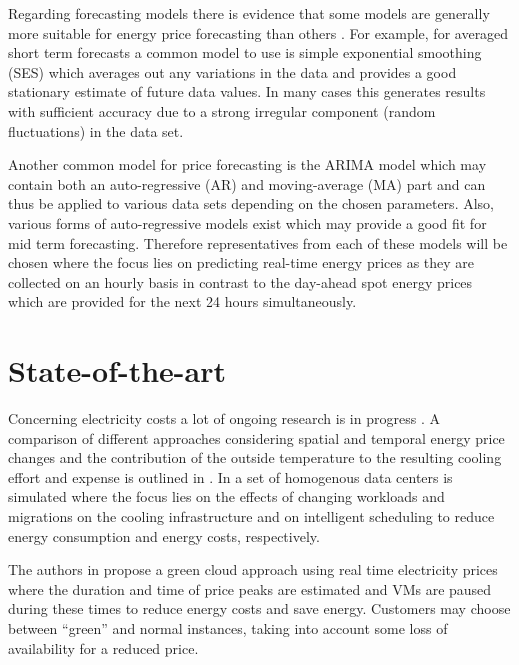 \documentclass[a4paper]{article}
\begin{document}
Regarding forecasting models there is evidence that some models are generally more suitable for energy price forecasting than others \cite{weron2008forecasting}\cite{weron2005forecasting}. For example, for averaged short term forecasts a common model to use is simple exponential smoothing (SES) which averages out any variations in the data and provides a good stationary estimate of future data values. In many cases this generates results with sufficient accuracy due to a strong irregular component (random fluctuations) in the data set. 

Another common model for price forecasting is the ARIMA model which may contain both an auto-regressive (AR) and moving-average (MA) part and can thus be applied to various data sets depending on the chosen parameters. Also, various forms of auto-regressive models exist which may provide a good fit for mid term forecasting. 
Therefore representatives from each of these models will be chosen where the focus lies on predicting real-time energy prices as they are collected on an hourly basis in contrast to the day-ahead spot energy prices which are provided for the next 24 hours simultaneously. 


\section{State-of-the-art}

Concerning electricity costs a lot of ongoing research is in progress \cite{guler2013cutting, le2011reducing}. A comparison of different approaches considering spatial and temporal energy price changes and the contribution of the outside temperature to the resulting cooling effort and expense is outlined in \cite{guler2013cutting}. In \cite{le2011reducing} a set of homogenous data centers is simulated where the focus lies on the effects of changing workloads and migrations on the cooling infrastructure and on intelligent scheduling to reduce energy consumption and energy costs, respectively. 


The authors in \cite{lucanin2013take} propose a green cloud approach using real time electricity prices where the duration and time of price peaks are estimated and VMs are paused during these times to reduce energy costs and save energy. Customers may choose between ``green'' and normal instances, taking into account some loss of availability for a reduced price. 
\end{document}
